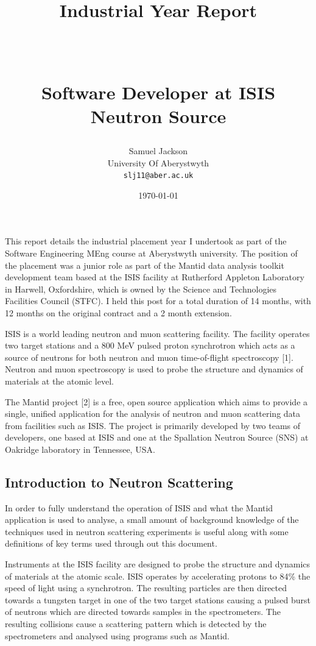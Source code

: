 \documentclass[paper=a4, fontsize=11pt]{scrartcl}	%
\title{
	\vspace{-1in} 	\usefont{OT1}{bch}{b}{n}
	\huge \strut Industrial Year Report \strut \\
	\Large \bfseries \strut Software Developer at ISIS Neutron Source \strut
}
\author{
	\usefont{OT1}{bch}{m}{n} Samuel Jackson
	\\ \usefont{OT1}{bch}{m}{n} University Of Aberystwyth
	\\   \texttt{slj11@aber.ac.uk}
}
\date{\today}
\numberwithin{equation}{section}															%
\numberwithin{figure}{section}																%
\numberwithin{table}{section}
\begin{document}
	\maketitle
	\clearpage
	\tableofcontents
	\clearpage

This report details the industrial placement year I undertook as part of
the Software Engineering MEng course at Aberystwyth university. The
position of the placement was a junior role as part of the Mantid data
analysis toolkit development team based at the ISIS facility at
Rutherford Appleton Laboratory in Harwell, Oxfordshire, which is owned
by the Science and Technologies Facilities Council (STFC). I held this
post for a total duration of 14 months, with 12 months on the original
contract and a 2 month extension.

ISIS is a world leading neutron and muon scattering facility. The
facility operates two target stations and a 800 MeV pulsed proton
synchrotron which acts as a source of neutrons for both neutron and muon
time-of-flight spectroscopy {[}1{]}. Neutron and muon spectroscopy is
used to probe the structure and dynamics of materials at the atomic
level.

The Mantid project {[}2{]} is a free, open source application which aims
to provide a single, unified application for the analysis of neutron and
muon scattering data from facilities such as ISIS. The project is
primarily developed by two teams of developers, one based at ISIS and
one at the Spallation Neutron Source (SNS) at Oakridge laboratory in
Tennessee, USA.

\subsection{Introduction to Neutron
Scattering}\label{introduction-to-neutron-scattering}

In order to fully understand the operation of ISIS and what the Mantid
application is used to analyse, a small amount of background knowledge
of the techniques used in neutron scattering experiments is useful along
with some definitions of key terms used through out this document.

Instruments at the ISIS facility are designed to probe the structure and
dynamics of materials at the atomic scale. ISIS operates by accelerating
protons to 84\% the speed of light using a synchrotron. The resulting
particles are then directed towards a tungsten target in one of the two
target stations causing a pulsed burst of neutrons which are directed
towards samples in the spectrometers. The resulting collisions cause a
scattering pattern which is detected by the spectrometers and analysed
using programs such as Mantid.
\end{document}
